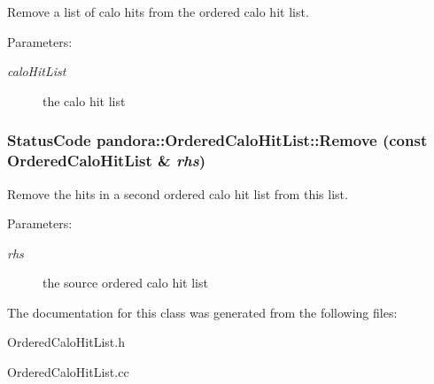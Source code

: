 Remove a list of calo hits from the ordered calo hit list. 

\begin{Desc}
\item[Parameters:]
\begin{description}
\item[{\em calo\-Hit\-List}]the calo hit list \end{description}
\end{Desc}
\subsubsection{\setlength{\rightskip}{0pt plus 5cm}Status\-Code pandora::Ordered\-Calo\-Hit\-List::Remove (const \bf{Ordered\-Calo\-Hit\-List} \& {\em rhs})}\label{classpandora_1_1OrderedCaloHitList_7831685c6af3765bfecf03cb65d0f544}


Remove the hits in a second ordered calo hit list from this list. 

\begin{Desc}
\item[Parameters:]
\begin{description}
\item[{\em rhs}]the source ordered calo hit list \end{description}
\end{Desc}


The documentation for this class was generated from the following files:\begin{CompactItemize}
\item 
Ordered\-Calo\-Hit\-List.h\item 
Ordered\-Calo\-Hit\-List.cc\end{CompactItemize}
